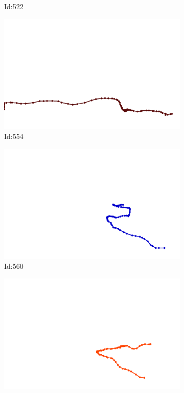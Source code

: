 \documentclass[12pt,twoside]{report}
\begin{document}
\begin{figure}
\begin{subfigure}[b]{0.20\textwidth}
\caption{Id:522}
\end{subfigure}
\begin{subfigure}[b]{0.20\textwidth}
\centering
\includegraphics[width=\textwidth]{../trajectories/554.png}
\caption{Id:554}
\end{subfigure}
\begin{subfigure}[b]{0.20\textwidth}
\centering
\includegraphics[width=\textwidth]{../trajectories/560.png}
\caption{Id:560}
\end{subfigure}
\begin{subfigure}[b]{0.20\textwidth}
\centering
\includegraphics[width=\textwidth]{../trajectories/562.png}

\end{subfigure}
\end{figure}
\end{document}
